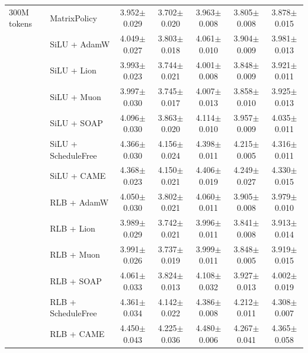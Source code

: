 \begin{table}[H]
\begin{tabular*}{\textwidth}{@{\extracolsep{\fill}}llccccc@{}}
\midrule
300M tokens & MatrixPolicy & 3.952$\pm$0.029 & 3.702$\pm$0.020 & 3.963$\pm$0.008 & 3.805$\pm$0.008 & 3.878$\pm$0.015 \\
 & SiLU + AdamW & 4.049$\pm$0.027 & 3.803$\pm$0.018 & 4.061$\pm$0.010 & 3.904$\pm$0.009 & 3.981$\pm$0.013 \\
 & SiLU + Lion & 3.993$\pm$0.023 & 3.744$\pm$0.021 & 4.001$\pm$0.008 & 3.848$\pm$0.009 & 3.921$\pm$0.011 \\
 & SiLU + Muon & 3.997$\pm$0.030 & 3.745$\pm$0.017 & 4.007$\pm$0.013 & 3.858$\pm$0.010 & 3.925$\pm$0.013 \\
 & SiLU + SOAP & 4.096$\pm$0.030 & 3.863$\pm$0.020 & 4.114$\pm$0.010 & 3.957$\pm$0.009 & 4.035$\pm$0.011 \\
 & SiLU + ScheduleFree & 4.366$\pm$0.030 & 4.156$\pm$0.024 & 4.398$\pm$0.011 & 4.215$\pm$0.005 & 4.316$\pm$0.011 \\
 & SiLU + CAME & 4.368$\pm$0.023 & 4.150$\pm$0.021 & 4.406$\pm$0.019 & 4.249$\pm$0.027 & 4.330$\pm$0.015 \\
 & RLB + AdamW & 4.050$\pm$0.030 & 3.802$\pm$0.021 & 4.060$\pm$0.011 & 3.905$\pm$0.008 & 3.979$\pm$0.010 \\
 & RLB + Lion & 3.989$\pm$0.029 & 3.742$\pm$0.021 & 3.996$\pm$0.011 & 3.841$\pm$0.008 & 3.913$\pm$0.014 \\
 & RLB + Muon & 3.991$\pm$0.026 & 3.737$\pm$0.019 & 3.999$\pm$0.011 & 3.848$\pm$0.005 & 3.919$\pm$0.015 \\
 & RLB + SOAP & 4.061$\pm$0.033 & 3.824$\pm$0.013 & 4.108$\pm$0.032 & 3.927$\pm$0.013 & 4.002$\pm$0.019 \\
 & RLB + ScheduleFree & 4.361$\pm$0.034 & 4.142$\pm$0.022 & 4.386$\pm$0.008 & 4.212$\pm$0.011 & 4.308$\pm$0.007 \\
 & RLB + CAME & 4.450$\pm$0.043 & 4.225$\pm$0.036 & 4.480$\pm$0.006 & 4.267$\pm$0.041 & 4.365$\pm$0.058 \\
\bottomrule
\end{tabular*}
\endgroup
\end{table}
